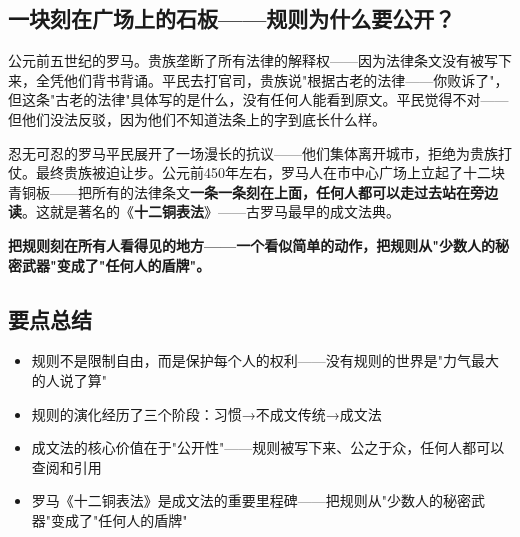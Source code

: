 \documentclass[a4paper,12pt]{ctexart}
\begin{document}
\subsection*{一块刻在广场上的石板——规则为什么要公开？}

公元前五世纪的罗马。贵族垄断了所有法律的解释权——因为法律条文没有被写下来，全凭他们背书背诵。平民去打官司，贵族说"根据古老的法律——你败诉了"，但这条"古老的法律"具体写的是什么，没有任何人能看到原文。平民觉得不对——但他们没法反驳，因为他们不知道法条上的字到底长什么样。

忍无可忍的罗马平民展开了一场漫长的抗议——他们集体离开城市，拒绝为贵族打仗。最终贵族被迫让步。公元前450年左右，罗马人在市中心广场上立起了十二块青铜板——把所有的法律条文\textbf{一条一条刻在上面，任何人都可以走过去站在旁边读}。这就是著名的《\textbf{十二铜表法}》——古罗马最早的成文法典。

\textbf{把规则刻在所有人看得见的地方——一个看似简单的动作，把规则从"少数人的秘密武器"变成了"任何人的盾牌"。}


\subsection*{要点总结}
\begin{itemize}
  \item 规则不是限制自由，而是保护每个人的权利——没有规则的世界是"力气最大的人说了算"
  \item 规则的演化经历了三个阶段：习惯→不成文传统→成文法
  \item 成文法的核心价值在于"公开性"——规则被写下来、公之于众，任何人都可以查阅和引用
  \item 罗马《十二铜表法》是成文法的重要里程碑——把规则从"少数人的秘密武器"变成了"任何人的盾牌"
\end{itemize}
\end{document}
